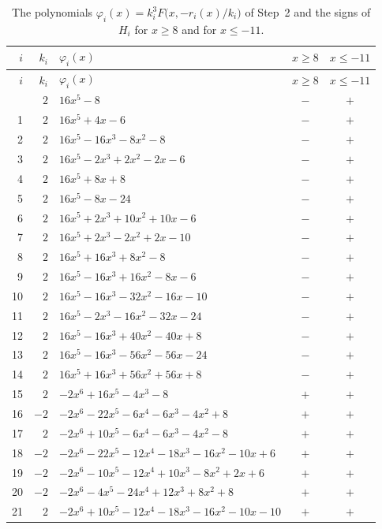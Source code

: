\documentclass[11pt]{article}
\begin{document}
\begingroup\footnotesize
\setlength{\LTcapwidth}{\textwidth}
\begin{longtable}{@{}rrlcc@{}}
\caption{The polynomials $\varphi_i(x)=k_i^3F\bigl(x,-r_i(x)/k_i\bigr)$ of Step~2 and the signs of $H_i$ for $x\geq8$ and for $x\leq-11$.}\label{tab:phi}\\
\hline $i$ & $k_i$ & $\varphi_i(x)$ & $x\geq8$ & $x\leq-11$\\\hline\endfirsthead\hline $i$ & $k_i$ & $\varphi_i(x)$ & $x\geq8$ & $x\leq-11$\\\hline\endhead\hline\endfoot
0 & $2$ & $16x^{5}-8$ & $-$ & $+$\\
1 & $2$ & $16x^{5}+4x-6$ & $-$ & $+$\\
2 & $2$ & $16x^{5}-16x^{3}-8x^{2}-8$ & $-$ & $+$\\
3 & $2$ & $16x^{5}-2x^{3}+2x^{2}-2x-6$ & $-$ & $+$\\
4 & $2$ & $16x^{5}+8x+8$ & $-$ & $+$\\
5 & $2$ & $16x^{5}-8x-24$ & $-$ & $+$\\
6 & $2$ & $16x^{5}+2x^{3}+10x^{2}+10x-6$ & $-$ & $+$\\
7 & $2$ & $16x^{5}+2x^{3}-2x^{2}+2x-10$ & $-$ & $+$\\
8 & $2$ & $16x^{5}+16x^{3}+8x^{2}-8$ & $-$ & $+$\\
9 & $2$ & $16x^{5}-16x^{3}+16x^{2}-8x-6$ & $-$ & $+$\\
10 & $2$ & $16x^{5}-16x^{3}-32x^{2}-16x-10$ & $-$ & $+$\\
11 & $2$ & $16x^{5}-2x^{3}-16x^{2}-32x-24$ & $-$ & $+$\\
12 & $2$ & $16x^{5}-16x^{3}+40x^{2}-40x+8$ & $-$ & $+$\\
13 & $2$ & $16x^{5}-16x^{3}-56x^{2}-56x-24$ & $-$ & $+$\\
14 & $2$ & $16x^{5}+16x^{3}+56x^{2}+56x+8$ & $-$ & $+$\\
15 & $2$ & $-2x^{6}+16x^{5}-4x^{3}-8$ & $+$ & $+$\\
16 & $-2$ & $-2x^{6}-22x^{5}-6x^{4}-6x^{3}-4x^{2}+8$ & $+$ & $+$\\
17 & $2$ & $-2x^{6}+10x^{5}-6x^{4}-6x^{3}-4x^{2}-8$ & $+$ & $+$\\
18 & $-2$ & $-2x^{6}-22x^{5}-12x^{4}-18x^{3}-16x^{2}-10x+6$ & $+$ & $+$\\
19 & $-2$ & $-2x^{6}-10x^{5}-12x^{4}+10x^{3}-8x^{2}+2x+6$ & $+$ & $+$\\
20 & $-2$ & $-2x^{6}-4x^{5}-24x^{4}+12x^{3}+8x^{2}+8$ & $+$ & $+$\\
21 & $2$ & $-2x^{6}+10x^{5}-12x^{4}-18x^{3}-16x^{2}-10x-10$ & $+$ & $+$\\

\end{longtable}
\end{document}
